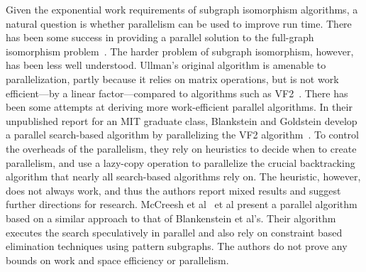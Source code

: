 %

Given the exponential work requirements of subgraph isomorphism
algorithms, a natural question is whether parallelism can be used to
improve run time.
%
%
There has been some success in providing a parallel solution to the
full-graph isomorphism problem~\cite{gpuiso,gpu-canon-forms}.
%
The harder problem of subgraph isomorphism, however, has been less
well understood. 
%
Ullman's original algorithm is amenable to parallelization, partly
because it relies on matrix operations, but is not work efficient---by
a linear factor---compared to algorithms such as VF2~\cite{VF2}.
%
There has been some attempts at deriving more work-efficient parallel
algorithms.
%
In their unpublished report for an MIT graduate class, Blankstein and
Goldstein develop a parallel search-based algorithm by parallelizing
the VF2 algorithm~\cite{blankstein}.
%
To control the overheads of the parallelism, they rely on heuristics
to decide when to create parallelism, and use a lazy-copy operation to
parallelize the crucial backtracking algorithm that nearly all
search-based algorithms rely on.
%
The heuristic, however, does not always work, and thus the authors
report mixed results and suggest further directions for research.
%
%
McCreesh et al~\cite{McCreesh15} et al present a parallel algorithm
based on a similar approach to that of Blankenstein et al's.  Their
algorithm executes the search speculatively in parallel and also rely
on constraint based elimination techniques using pattern subgraphs.
%
The authors do not prove any bounds on work and space efficiency or parallelism.



